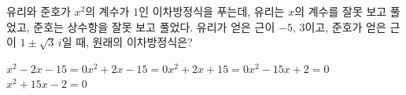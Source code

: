 유리와 준호가 $x^2$의 계수가 $1$인 이차방정식을 푸는데, 유리는 $x$의 계수를 잘못 보고 풀었고, 준호는 상수항을 잘못 보고 풀었다. 유리가 얻은 근이 $-5$, $3$이고, 준호가 얻은 근이 $1\pm\sqrt{3}\,i$일 때, 원래의 이차방정식은?
\begin{choicesii}{$x^2-2x-15=0$}{$x^2+2x-15=0$}{$x^2+2x+15=0$}{$x^2-15x+2=0$}{$x^2+15x-2=0$}\end{choicesii}
